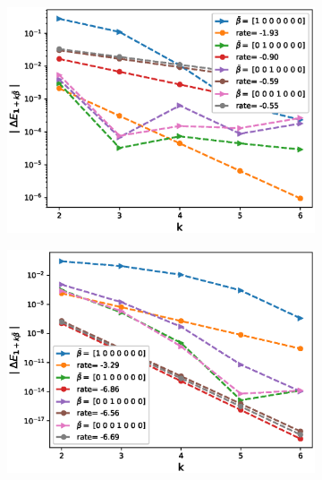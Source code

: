 \FloatBarrier
\begin{figure}[htb]
	\centering %
	\begin{subfigure}{0.4\textwidth}
		\includegraphics[width=\linewidth]{./figures/Heston_single_call_full_truncation_vol/mixed_rates/set3/N_4/first_difference_heston_4steps_hierarchical}
		\caption{}
		\label{fig:1}
	\end{subfigure}\hfil %
	\begin{subfigure}{0.4\textwidth}
		\includegraphics[width=\linewidth]{./figures/Heston_single_call_ABR_moment_matching/mixed_rates/set3/N_4/first_difference_heston_4steps_hierarchical}
		\caption{}
		\label{fig:2}
	\end{subfigure}\hfil %
	\begin{subfigure}{0.4\textwidth}

\end{subfigure}
\end{figure}
